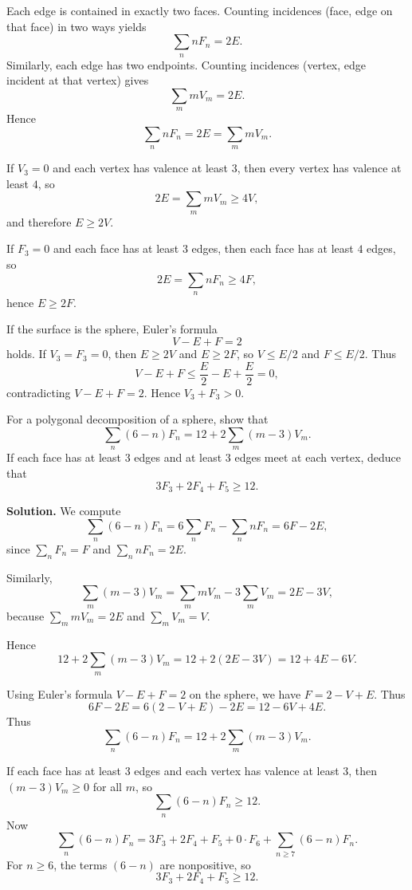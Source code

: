 \begin{solution}
Each edge is contained in exactly two faces.  
	Counting incidences (face, edge on that face) in two ways yields
	\[
	\sum_n nF_n = 2E.
	\]
	Similarly, each edge has two endpoints.  Counting incidences
	(vertex, edge incident at that vertex) gives
	\[
	\sum_m mV_m = 2E.
	\]
	Hence
	\[
	\sum_n nF_n = 2E = \sum_m mV_m.
	\]
	
	If $V_3 = 0$ and each vertex has valence at least $3$, then every vertex
	has valence at least $4$, so
	\[
	2E = \sum_m mV_m \ge 4V,
	\]
	and therefore $E \ge 2V$.
	
	If $F_3 = 0$ and each face has at least $3$ edges, then each face has at least
	$4$ edges, so
	\[
	2E = \sum_n nF_n \ge 4F,
	\]
	hence $E \ge 2F$.
	
	If the surface is the sphere, Euler's formula
	\[
	V - E + F = 2
	\]
	holds. If $V_3 = F_3 = 0$, then $E \ge 2V$ and $E \ge 2F$, so
	$V \le E/2$ and $F \le E/2$. Thus
	\[
	V - E + F \le \frac{E}{2} - E + \frac{E}{2} = 0,
	\]
	contradicting $V - E + F = 2$.  
	Hence $V_3 + F_3 > 0$.
	
	\par\smallskip\noindent\textbullet\enspace 
	For a polygonal decomposition of a sphere, show that
	\[
	\sum_{n} (6-n) F_{n}
	= 12 + 2 \sum_{m} (m-3) V_{m}.
	\]
	If each face has at least $3$ edges and at least $3$ edges meet
	at each vertex, deduce that
	\[
	3F_{3} + 2F_{4} + F_{5} \ge 12.
	\]
	
	\medskip
	\textbf{Solution.}
	We compute
	\[
	\sum_n (6-n)F_n
	= 6\sum_n F_n - \sum_n nF_n
	= 6F - 2E,
	\]
	since $\sum_n F_n = F$ and $\sum_n nF_n = 2E$.
	
	Similarly,
	\[
	\sum_m (m-3)V_m
	= \sum_m mV_m - 3\sum_m V_m
	= 2E - 3V,
	\]
	because $\sum_m mV_m = 2E$ and $\sum_m V_m = V$.
	
	Hence
	\[
	12 + 2\sum_m (m-3)V_m
	= 12 + 2(2E - 3V)
	= 12 + 4E - 6V.
	\]
	
	Using Euler's formula $V - E + F = 2$ on the sphere, we have
	$F = 2 - V + E$. Thus
	\[
	6F - 2E
	= 6(2 - V + E) - 2E
	= 12 - 6V + 4E.
	\]
	Thus
	\[
	\sum_n (6-n)F_n = 12 + 2\sum_m (m-3)V_m.
	\]
	
	If each face has at least 3 edges and each vertex has valence at least 3,
	then $(m-3)V_m \ge 0$ for all $m$, so
	\[
	\sum_n (6-n)F_n \ge 12.
	\]
	Now
	\[
	\sum_n (6-n)F_n
	= 3F_3 + 2F_4 + F_5 + 0\cdot F_6 
	+ \sum_{n\ge 7} (6-n)F_n.
	\]
	For $n \ge 6$, the terms $(6-n)$ are nonpositive, so
	\[
	3F_3 + 2F_4 + F_5 \ge 12.
	\]
	

\end{solution}
